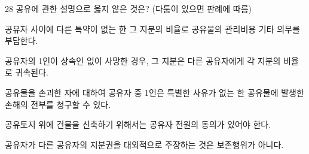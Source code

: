 \begin{question}{28}
공유에 관한 설명으로 옳지 않은 것은? (다툼이 있으면 판례에 따름)
\begin{choices}
  \item 공유자 사이에 다른 특약이 없는 한 그 지분의 비율로 공유물의 관리비용 기타 의무를 부담한다.
  \item 공유자의 1인이 상속인 없이 사망한 경우, 그 지분은 다른 공유자에게 각 지분의 비율로 귀속된다.
  \item 공유물을 손괴한 자에 대하여 공유자 중 1인은 특별한 사유가 없는 한 공유물에 발생한 손해의 전부를 청구할 수 있다.
  \item 공유토지 위에 건물을 신축하기 위해서는 공유자 전원의 동의가 있어야 한다.
  \item 공유자가 다른 공유자의 지분권을 대외적으로 주장하는 것은 보존행위가 아니다.
\end{choices}
\end{question}
